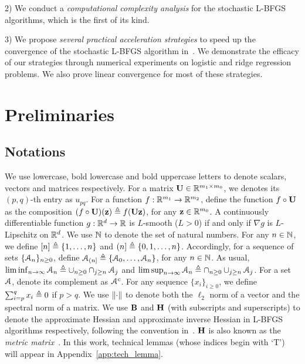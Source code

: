 \documentclass[10pt,twocolumn,journal]{IEEEtran}
\begin{document}
2) We conduct a {\em computational complexity analysis} for the stochastic L-BFGS algorithms, which is the first of its kind. %

3) We propose {\em several practical acceleration strategies} to speed up the convergence of the stochastic L-BFGS algorithm in~\cite{Moritz_16}. %
We demonstrate the efficacy of our strategies through numerical experiments on logistic and ridge regression problems. We also prove linear convergence for most of these strategies. %

\section{Preliminaries}


\subsection{Notations}
We use lowercase, bold lowercase and bold uppercase letters to denote scalars, vectors and matrices respectively. 
For a matrix $\mathbf{U}\in\mathbb{R}^{m_1\times m_0}$, we denotes its $(p,q)$-th entry as $u_{pq}$. For a function $f:\mathbb{R}^{m_1}\to\mathbb{R}^{m_2}$, define  the function $f\circ\mathbf{U}$ as the composition $(f\circ\mathbf{U})(\mathbf{z})\triangleq f(\mathbf{U}\mathbf{z})$, for any $\mathbf{z}\in\mathbb{R}^{m_0}$. A continuously differentiable function $g:\mathbb{R}^d\to\mathbb{R}$ is $L$-smooth ($L\!>\!0$) if and only if $\nabla g$ is $L$-Lipschitz on $\mathbb{R}^d$.   
We use $\mathbb{N}$ to denote the set of natural numbers. For any $n\in\mathbb{N}$, we define $[n]\triangleq\{1,\ldots,n\}$ and $(n]\triangleq\{0,1,\ldots,n\}$. Accordingly, for a sequence of sets $\{\mathcal{A}_n\}_{n\ge 0}$, define $\mathcal{A}_{(n]}\triangleq\{\mathcal{A}_0,\ldots,\mathcal{A}_n\}$, for any $n\in\mathbb{N}$. 
As usual, $\liminf_{n\to\infty}\mathcal{A}_n\triangleq \cup_{n\ge 0}\cap_{j\ge n}\mathcal{A}_j$ and $\limsup_{n\to\infty}\mathcal{A}_n\triangleq \cap_{n\ge 0}\cup_{j\ge n}\mathcal{A}_j$. For a set $\mathcal{A}$, denote its complement as $\mathcal{A}^{\mathrm{c}}$. 
For any sequence $\{x_i\}_{i\ge 0}$, we define $\sum_{i=p}^{q} x_i \triangleq 0$ if $p>q$.  
We use $\left\Vert\cdot\right\Vert$ to denote both the $\ell_2$ norm of a vector and the spectral norm of a matrix. 
We use $\mathbf{B}$ and $\mathbf{H}$ (with subscripts and superscripts) to denote the approximate Hessian and approximate inverse Hessian in L-BFGS algorithms respectively, following the convention in~\cite{Nocedal_06}. %
$\mathbf{H}$ is also known as the {\em metric matrix}~\cite{Gold_70}. 
In this work, technical lemmas (whose indices begin with `T') will appear in Appendix~\ref{app:tech_lemma}.  
\end{document}
